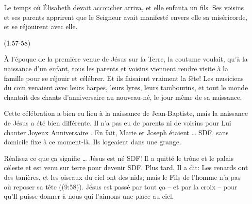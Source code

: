 

\epigraph{%
Le temps où Élisabeth devait accoucher arriva, et elle enfanta un fils. Ses voisins et ses parents apprirent que le Seigneur avait manifesté envers elle sa miséricorde, et se réjouirent avec elle.}{(1:57-58)}

À l'époque de la première venue de Jésus sur la Terre, la coutume voulait, qu'à la naissance d'un enfant, tous les parents et voisins viennent rendre visite à la famille pour se réjouir et célébrer. Et ils faisaient vraiment la fête! Les musiciens du coin venaient avec leurs harpes, leurs lyres, leurs tambourins, et tout le monde chantait des chants d'anniversaire au nouveau-né, le jour même de sa naissance.

Cette célébration a bien eu lieu à la naissance de Jean-Baptiste, mais la naissance de Jésus a été bien différente. Il n'a pas eu de parents ni de voisins pour Lui chanter \og Joyeux Anniversaire \fg{}. En fait, Marie et Joseph étaient … SDF, \og sans domicile fixe \fg{} à ce moment-là. Ils logeaient dans une grange.

Réalisez ce que ça signifie … Jésus est né SDF! Il a quitté le trône et le palais céleste et est venu sur terre pour devenir SDF. Plus tard, Il a dit: \og Les renards ont des tanières, et les oiseaux du ciel ont des nids; mais le Fils de l’homme n’a pas où reposer sa tête \fg{} ((9:58)). Jésus est passé par tout ça – et par la croix – pour qu'Il puisse donner à nous qui l'aimons une place au ciel.

